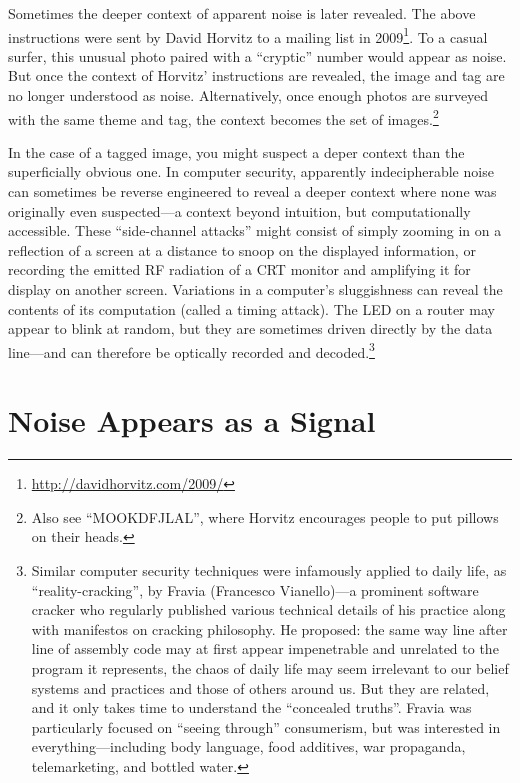 \documentclass{thesis}
\begin{document}
Sometimes the deeper context of apparent noise is later revealed. The above instructions were sent by David Horvitz to a mailing list in 2009\footnote{\url{http://davidhorvitz.com/2009/}}. To a casual surfer, this unusual photo paired with a ``cryptic'' number\cite{david_horvitz_flickr:_????-1} would appear as noise. But once the context of Horvitz' instructions are revealed, the image and tag are no longer understood as noise. Alternatively, once enough photos are surveyed with the same theme and tag, the context becomes the set of images.\footnote{Also see ``MOOKDFJLAL''\cite{david_horvitz_flickr:_????}, where Horvitz encourages people to put pillows on their heads.}

In the case of a tagged image, you might suspect a deper context than the superficially obvious one. In computer security, apparently indecipherable noise can sometimes be reverse engineered to reveal a deeper context where none was originally even suspected---a context beyond intuition, but computationally accessible. These ``side-channel attacks'' might consist of simply zooming in on a reflection of a screen at a distance to snoop on the displayed information,\cite{w._wayt_gibbs_hackers_2009} or recording the emitted RF radiation of a CRT monitor and amplifying it for display on another screen.\cite{erik_thiele_tempest_????} Variations in a computer's sluggishness can reveal the contents of its computation (called a timing attack). The LED on a router may appear to blink at random, but they are sometimes driven directly by the data line---and can therefore be optically recorded and decoded.\footnote{Similar computer security techniques were infamously applied to daily life, as ``reality-cracking''\cite{francesco_vianello_reality_????}, by Fravia (Francesco Vianello)---a prominent software cracker who regularly published various technical details of his practice along with manifestos on cracking philosophy. He proposed: the same way line after line of assembly code may at first appear impenetrable and unrelated to the program it represents, the chaos of daily life may seem irrelevant to our belief systems and practices and those of others around us. But they are related, and it only takes time to understand the ``concealed truths''. Fravia was particularly focused on ``seeing through'' consumerism, but was interested in everything---including body language, food additives, war propaganda, telemarketing, and bottled water.}

\section{Noise Appears as a Signal}
\end{document}
